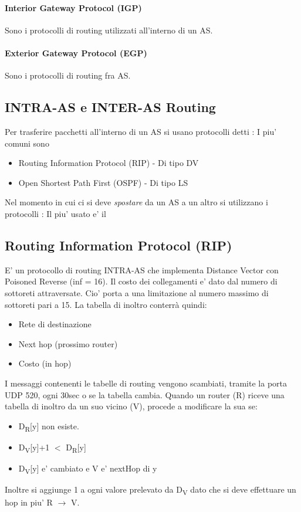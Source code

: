 \paragraph{Interior Gateway Protocol (IGP)} Sono i protocolli di routing utilizzati all'interno di un AS.
\paragraph{Exterior Gateway Protocol (EGP)} Sono i protocolli di routing fra AS.
\subsection{INTRA-AS e INTER-AS Routing}
Per trasferire pacchetti all'interno di un AS si usano protocolli detti : I piu' comuni sono
\begin{itemize}
    \item Routing Information Protocol (RIP) - Di tipo DV
    \item Open Shortest Path First (OSPF) - Di tipo LS
\end{itemize}
Nel momento in cui ci si deve \textit{spostare} da un AS a un altro si utilizzano i protocolli : Il piu' usato e' il 
\subsection{Routing Information Protocol (RIP)}
E' un protocollo di routing INTRA-AS che implementa Distance Vector con Poisoned Reverse (inf = 16).
Il costo dei collegamenti e' dato dal numero di sottoreti attraversate.
Cio' porta a una limitazione al numero massimo di sottoreti pari a 15.
La tabella di inoltro conterrà quindi:
\begin{itemize}
    \item Rete di destinazione
    \item Next hop (prossimo router)
    \item Costo (in hop)
\end{itemize}
I messaggi contenenti le tabelle di routing vengono scambiati, tramite la porta UDP 520, ogni 30sec o se la tabella cambia.
Quando un router (R) riceve una tabella di inoltro da un suo vicino (V), procede a modificare la sua se:
\begin{itemize}
    \item D\textsubscript{R}[y] non esiste.
    \item D\textsubscript{V}[y]+1 $<$ D\textsubscript{R}[y]
    \item D\textsubscript{V}[y] e' cambiato e V e' nextHop di y
\end{itemize}
Inoltre si aggiunge 1 a ogni valore prelevato da D\textsubscript{V} dato che si deve effettuare un hop in piu' R $\rightarrow$ V.
